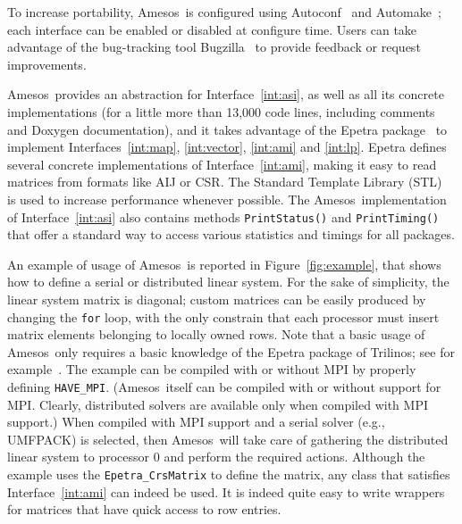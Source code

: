\documentclass[acmtoms,acmnow]{acmtrans2m}
\newcommand{\amesos}{{\sc Amesos}}
\begin{document}
To increase portability, \amesos\ is configured using
Autoconf~\cite{Autoconf} and Automake~\cite{Automake}; each
interface can be enabled or disabled at configure time. Users can
take advantage of the bug-tracking tool Bugzilla~\cite{Bugzilla} to
provide feedback or request improvements.

\medskip

\amesos\ provides an abstraction for Interface~\ref{int:asi}, as
well as all its concrete implementations (for a little more than
13,000 code lines, including comments and Doxygen
documentation), and it takes advantage of the {\sc Epetra}
package~\cite{Epetra-Ref-Guide} to implement
Interfaces~\ref{int:map}, \ref{int:vector}, \ref{int:ami} and
\ref{int:lp}. {\sc Epetra} defines several concrete implementations
of Interface~\ref{int:ami}, making it easy to read matrices from
formats
  like AIJ or CSR.
The Standard Template Library (STL)~\cite{wise96overview} is used to
increase performance whenever possible. The \amesos\ implementation
of Interface~\ref{int:asi} also contains methods {\tt PrintStatus()}
and {\tt PrintTiming()} that offer a standard way to access various
statistics and timings for all packages.

An example of usage of \amesos\ is reported in
Figure~\ref{fig:example}, that shows how to define a
serial or distributed linear system. For the sake of simplicity, the linear
system matrix is diagonal; custom matrices can be easily produced by
changing the \verb!for! loop, with the only constrain that each processor
must insert matrix elements belonging to locally owned rows.
Note that a basic usage of \amesos\ only
requires a basic knowledge of the Epetra package of
Trilinos; see for example~\cite{Trilinos-Tutorial}. The example can
be compiled with or without MPI by properly defining \verb!HAVE_MPI!.
(\amesos\ itself can be compiled with or without support for MPI.
Clearly, distributed solvers are available only when compiled with
MPI support.) When compiled with MPI support and a serial solver
(e.g., UMFPACK) is selected, then \amesos\ will take care of
gathering the distributed linear system to processor 0 and perform
the required actions. Although the example uses the
\verb!Epetra_CrsMatrix! to define the matrix, any class that
satisfies Interface~\ref{int:ami} can indeed be used. It is indeed
quite easy to write wrappers for matrices that have quick access to
row entries.
\end{document}
